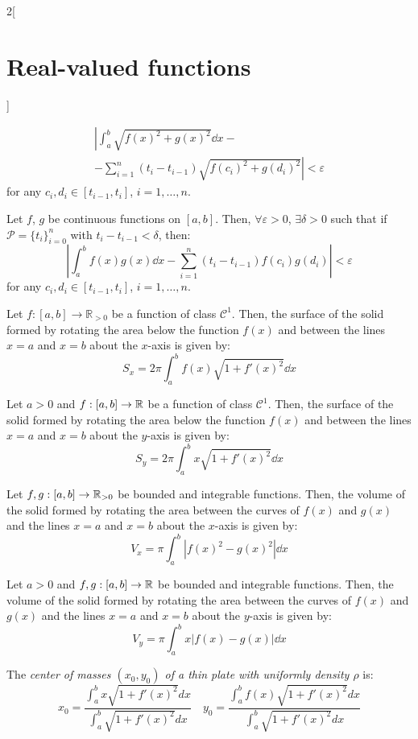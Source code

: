\documentclass[../../../main.tex]{subfiles}
\begin{document}
\begin{multicols}{2}[\section{Real-valued functions}]
\begin{lemma}
\begin{multline*}
      \left|\int_a^b\sqrt{{f(x)}^2+{g(x)}^2}\dd x\right.-\\-\left.\sum_{i=1}^n(t_i-t_{i-1})\sqrt{{f(c_i)}^2+{g(d_i)}^2}\right|<\varepsilon
    \end{multline*}
    for any $c_i,d_i\in[t_{i-1},t_i]$, $i=1,\ldots,n$.
  \end{lemma}
  \begin{lemma}
    Let $f$, $g$ be continuous functions on $[a,b]$. Then, $\forall\varepsilon>0$, $\exists\delta>0$ such that if $\mathcal{P}=\{t_i\}_{i=0}^n$ with $t_i-t_{i-1}<\delta$, then:
    $$\left|\int_a^bf(x)g(x)\dd x-\sum_{i=1}^n(t_i-t_{i-1})f(c_i)g(d_i)\right|<\varepsilon$$
    for any $c_i,d_i\in[t_{i-1},t_i]$, $i=1,\ldots,n$.
  \end{lemma}
  \begin{prop}
    Let $f:[a,b]\rightarrow\mathbb{R}_{>0}$ be a function of class $\mathcal{C}^1$. Then, the surface of the solid formed by rotating the area below the function $f(x)$ and between the lines $x = a$ and $x = b$ about the $x$-axis is given by: $$S_x=2\pi\int_a^bf(x)\sqrt{1+{f'(x)}^2}\dd x$$
  \end{prop}
  \begin{prop}
    Let $a>0$ and $f:[a,b]\rightarrow\mathbb{R}$ be a function of class $\mathcal{C}^1$. Then, the surface of the solid formed by rotating the area below the function $f(x)$ and between the lines $x = a$ and $x = b$ about the $y$-axis is given by: $$S_y=2\pi\int_a^bx\sqrt{1+{f'(x)}^2}\dd x$$
  \end{prop}
  \begin{prop}
    Let $f,g:[a,b]\rightarrow\mathbb{R}_{>0}$ be bounded and integrable functions. Then, the volume of the solid formed by rotating the area between the curves of $f(x)$ and $g(x)$ and the lines $x = a$ and $x = b$ about the $x$-axis is given by: $$V_x=\pi\int_a^b\left|{f(x)}^2-{g(x)}^2\right|\dd x$$
  \end{prop}
  \begin{prop}
    Let $a>0$ and $f,g:[a,b]\rightarrow\mathbb{R}$ be bounded and integrable functions. Then, the volume of the solid formed by rotating the area between the curves of $f(x)$ and $g(x)$ and the lines $x = a$ and $x = b$ about the $y$-axis is given by: $$V_y=\pi\int_a^bx\left|f(x)-g(x)\right|\dd x$$
  \end{prop}
  \begin{prop}
    The \textit{center of masses $(x_0,y_0)$ of a thin plate with uniformly density $\rho$} is: $$x_0=\frac{\displaystyle\int_a^bx\sqrt{1+{f'(x)}^2}dx}{\displaystyle\int_a^b\sqrt{1+{f'(x)}^2}dx}\quad y_0=\frac{\displaystyle\int_a^b f(x)\sqrt{1+{f'(x)}^2}dx}{\displaystyle\int_a^b\sqrt{1+{f'(x)}^2}dx}$$
  \end{prop}

\end{multicols}
\end{document}
